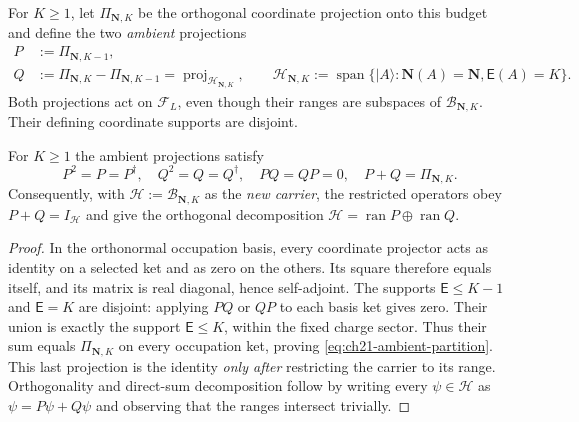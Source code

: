For $K\geq1$, let $\Pi_{\boldsymbol N,K}$ be the orthogonal coordinate
projection onto this budget and define the two \emph{ambient} projections
\begin{align}
P&:=\Pi_{\boldsymbol N,K-1},\\
Q&:=\Pi_{\boldsymbol N,K}-\Pi_{\boldsymbol N,K-1}
  =\operatorname{proj}_{\mathcal H_{\boldsymbol N,K}},\qquad
\mathcal H_{\boldsymbol N,K}:=
 \operatorname{span}\{\lvert A\rangle:\boldsymbol N(A)=\boldsymbol N,
                                  \mathsf E(A)=K\}.
\label{eq:ch21-shell-projections}
\end{align}
Both projections act on $\mathcal F_L$, even though their ranges are
subspaces of $\mathcal B_{\boldsymbol N,K}$.  Their defining coordinate
supports are disjoint.

\begin{proposition}
\label{prop:ch21-shell-partition}
For $K\geq1$ the ambient projections satisfy
\begin{equation}
 P^2=P=P^\dagger,\quad Q^2=Q=Q^\dagger,
 \quad PQ=QP=0,\quad P+Q=\Pi_{\boldsymbol N,K}.
\label{eq:ch21-ambient-partition}
\end{equation}
Consequently, with $\mathcal H:=\mathcal B_{\boldsymbol N,K}$ as the
\emph{new carrier}, the restricted operators obey $P+Q=I_{\mathcal H}$
and give the orthogonal decomposition
$\mathcal H=\operatorname{ran}P\oplus\operatorname{ran}Q$.
\end{proposition}
\begin{proof}
In the orthonormal occupation basis, every coordinate projector acts as
identity on a selected ket and as zero on the others.  Its square therefore
equals itself, and its matrix is real diagonal, hence self-adjoint.  The
supports $\mathsf E\leq K-1$ and $\mathsf E=K$ are disjoint: applying
$PQ$ or $QP$ to each basis ket gives zero.  Their union is exactly the
support $\mathsf E\leq K$, within the fixed charge sector.  Thus their
sum equals $\Pi_{\boldsymbol N,K}$ on every occupation ket, proving
\eqref{eq:ch21-ambient-partition}.  This last projection is the identity
\emph{only after} restricting the carrier to its range.  Orthogonality and
direct-sum decomposition follow by writing every $\psi\in\mathcal H$ as
$\psi=P\psi+Q\psi$ and observing that the ranges intersect trivially.
\end{proof}

